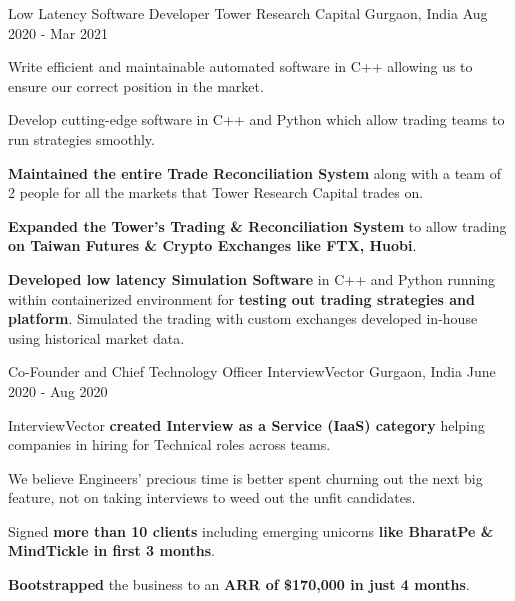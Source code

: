 \begin{cventries}

  \cventry
    {Low Latency Software Developer} %
    {Tower Research Capital} %
    {Gurgaon, India} %
    {Aug 2020 - Mar 2021} %
    {
      \begin{cvitems} %
        \item {Write efficient and maintainable automated software in C++ allowing us to ensure our correct position in the market.}
        \item {Develop cutting-edge software in C++ and Python which allow trading teams to run strategies smoothly.}
        \item {\textbf{Maintained the entire Trade Reconciliation System} along with a team of 2 people for all the markets that Tower Research Capital trades on.}
        \item {\textbf{Expanded the Tower's Trading \& Reconciliation System} to allow trading \textbf{on Taiwan Futures \& Crypto Exchanges like FTX, Huobi}.}
        \item {\textbf{Developed low latency Simulation Software} in C++ and Python running within containerized environment for \textbf{testing out trading strategies and platform}. Simulated the trading with custom exchanges developed in-house using historical market data.}
      \end{cvitems}
    }


  \cventry
    {Co-Founder and Chief Technology Officer} %
    {InterviewVector} %
    {Gurgaon, India} %
    {June 2020 - Aug 2020} %
    {
      \begin{cvitems} %
        \item {InterviewVector \textbf{created Interview as a Service (IaaS) category} helping companies in hiring for Technical roles across teams.}
        \item {We believe Engineers' precious time is better spent churning out the next big feature, not on taking interviews to weed out the unfit candidates.}
        \item {Signed \textbf{more than 10 clients} including emerging unicorns \textbf{like BharatPe \& MindTickle in first 3 months}.}
        \item {\textbf{Bootstrapped} the business to an \textbf{ARR of \$170,000 in just 4 months}.}
      \end{cvitems}
    }


\end{cventries}

